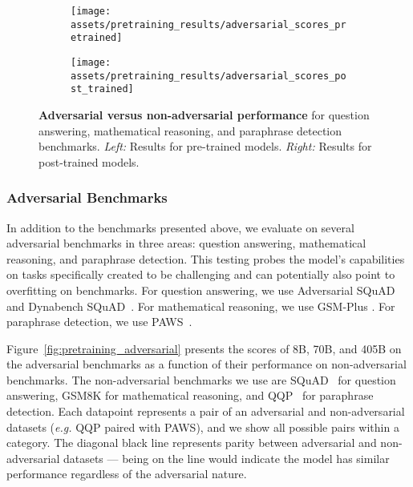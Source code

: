 \begin{figure}
    \centering
    \begin{subfigure}{0.4\textwidth}
        \texttt{[image: assets/pretraining\_results/adversarial\_scores\_pretrained]}
    \end{subfigure}
    \begin{subfigure}{0.4\textwidth}
        \texttt{[image: assets/pretraining\_results/adversarial\_scores\_post\_trained]}
    \end{subfigure}
    \caption{\textbf{Adversarial versus non-adversarial performance} for question answering, mathematical reasoning, and paraphrase detection benchmarks. \emph{Left:} Results for pre-trained models. \emph{Right:} Results for post-trained models.}\label{fig:pretraining_adversarial}\label{fig:posttraining_adversarial}
\end{figure}

\subsubsection{Adversarial Benchmarks}
\label{subsec:adversarial}

In addition to the benchmarks presented above, we evaluate on several adversarial benchmarks in three areas: question answering, mathematical reasoning, and paraphrase detection.
This testing probes the model's capabilities on tasks specifically created to be challenging and can potentially also point to overfitting on benchmarks.
For question answering, we use Adversarial SQuAD~\citep{jia-liang-2017-adversarial} and Dynabench SQuAD~\citep{kiela-etal-2021-dynabench}.
For mathematical reasoning, we use GSM-Plus \citep{li2024gsm}.
For paraphrase detection, we use PAWS~\citep{zhang-etal-2019-paws}.

Figure~\ref{fig:pretraining_adversarial} presents the scores of \llamathree 8B, 70B, and 405B on the adversarial benchmarks as a function of their performance on non-adversarial benchmarks.
The non-adversarial benchmarks we use are SQuAD~\citep{rajpurkar-etal-2016-squad} for question answering, GSM8K for mathematical reasoning, and QQP~\citep{quoraFirstQuora} for paraphrase detection.
Each datapoint represents a pair of an adversarial and non-adversarial datasets (\emph{e.g.} QQP paired with PAWS), and we show all possible pairs within a category.
The diagonal black line represents parity between adversarial and non-adversarial datasets --- being on the line would indicate the model has similar performance regardless of the adversarial nature.

